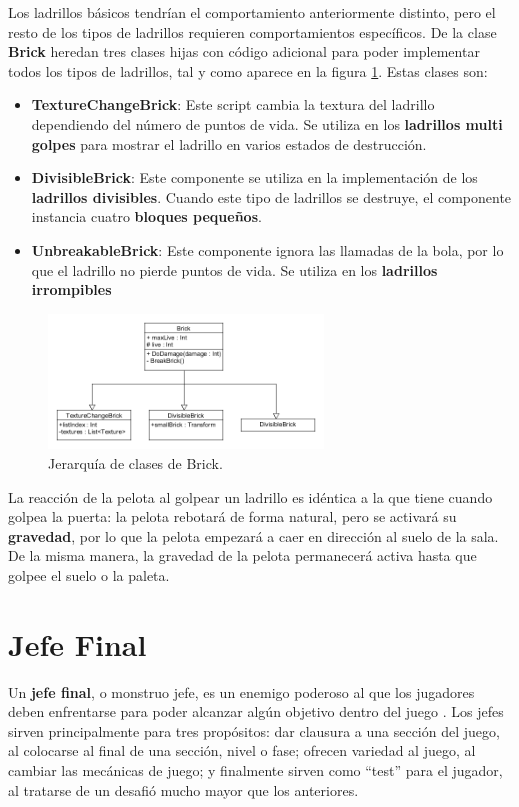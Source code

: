Los ladrillos básicos tendrían el comportamiento anteriormente distinto, pero el resto de los tipos de ladrillos requieren comportamientos específicos. De la clase \textbf{Brick} heredan tres clases hijas con código adicional para poder implementar todos los tipos de ladrillos, tal y como aparece en la figura \ref{brick_classes}. Estas clases son:
\begin{itemize}
\item \textbf{TextureChangeBrick}: Este script cambia la textura del ladrillo dependiendo del número de puntos de vida. Se utiliza en los \textbf{ladrillos multi golpes} para mostrar el ladrillo en varios estados de destrucción.
\item \textbf{DivisibleBrick}: Este componente se utiliza en la implementación de los \textbf{ladrillos divisibles}. Cuando este tipo de ladrillos se destruye, el componente instancia cuatro \textbf{bloques pequeños}.
\item \textbf{UnbreakableBrick}: Este componente ignora las llamadas de la bola, por lo que el ladrillo no pierde puntos de vida. Se utiliza en los \textbf{ladrillos irrompibles}
\end{itemize}
\begin{figure}[h]
	\includegraphics[width=0.65\textwidth]{images/estructura/fisica/brick_classes}
	\centering
	\caption{Jerarquía de clases de Brick.}
	\label{brick_classes}
\end{figure}

La reacción de la pelota al golpear un ladrillo es idéntica a la que tiene cuando golpea la puerta: la pelota rebotará de forma natural, pero se activará su \textbf{gravedad}, por lo que la pelota empezará a caer en dirección al suelo de la sala. De la misma manera, la gravedad de la pelota permanecerá activa hasta que golpee el suelo o la paleta.

\section{Jefe Final}
Un \textbf{jefe final}, o monstruo jefe, es un enemigo poderoso al que los jugadores deben enfrentarse para poder alcanzar algún objetivo dentro del juego \cite{game_design_patterns}. Los jefes sirven principalmente para tres propósitos: dar clausura a una sección del juego, al colocarse al final de una sección, nivel o fase; ofrecen variedad al juego, al cambiar las mecánicas de juego; y finalmente sirven como ``test'' para el jugador, al tratarse de un desafió mucho mayor que los anteriores. 

